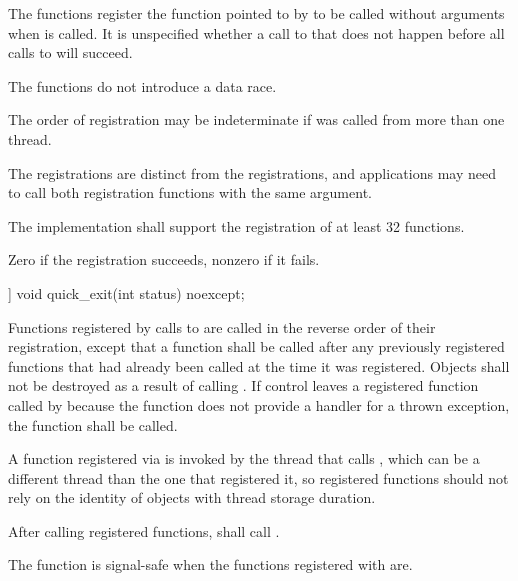 \begin{itemdescr}
\pnum
\effects The  functions register the function pointed to by 
to be called without arguments when  is called.
It is unspecified whether a call to  that does not
happen before all calls to  will succeed. \begin{note} The
 functions do not introduce a
data race. \end{note}
\begin{note}
The order of registration may be indeterminate if  was called from more
than one thread.
\end{note}
\begin{note} The
 registrations are distinct from the  registrations,
and applications may need to call both registration functions with the same argument.
\end{note}

\pnum
\implimits
The implementation shall support the registration of at least 32 functions.

\pnum
\returns Zero if the registration succeeds, nonzero if it fails.
\end{itemdescr}

%
\begin{itemdecl}
[[noreturn]] void quick_exit(int status) noexcept;
\end{itemdecl}

\begin{itemdescr}
\pnum
\effects Functions registered by calls to  are called in the
reverse order of their registration, except that a function shall be called after any
previously registered functions that had already been called at the time it was
registered. Objects shall not be destroyed as a result of calling .
If control leaves a registered function called by  because the
function does not provide a handler for a thrown exception, the function  shall
be called.
\begin{note}
A function registered via 
is invoked by the thread that calls ,
which can be a different thread
than the one that registered it, so registered functions should not rely on the identity
of objects with thread storage duration.
\end{note}
After calling registered functions,  shall call .

\pnum
\remarks
{}%
The function  is signal-safe
when the functions registered with  are.
\end{itemdescr}

